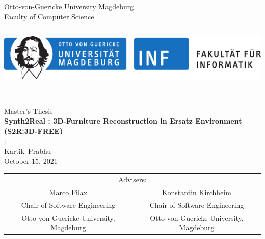 \documentclass[
]{thesis}
\newcommand{\university}{Otto-von-Guericke University Magdeburg}
\newcommand{\school}{Faculty of Computer Science}
\newcommand{\logo}{\includegraphics[trim=0mm 0mm 50mm 0mm,clip,height=3cm]{ovgu}}
\newcommand{\advisorone}{Marco Filax}
\newcommand{\departmentone}{Chair of Software Engineering}
\newcommand{\universityone}{Otto-von-Guericke University, Magdeburg}
\newcommand{\advisortwo}{Konstantin Kirchheim}
\newcommand{\universitytwo}{Otto-von-Guericke University, Magdeburg}
\newcommand{\thesiskind}{Master's Thesis}
\newcommand{\theforename}{Kartik}
\newcommand{\thesurname}{Prabhu}
\newcommand{\thetitle}{Synth2Real : 3D-Furniture Reconstruction in Ersatz Environment \\ (S2R:3D-FREE)}
\newcommand{\thedate}{October 15, 2021}
\begin{document}
\frontmatter
\renewcommand{\proofname}{\itshape\biolinum{Proof}} %
\newcommand{\theauthor}{\theforename\ \thesurname}
\newcommand{\theauthorrev}{\thesurname,\ \theforename}
\graphicspath{{files/}}

\begin{titlepage}
    \thispagestyle{empty}
    \begin{center}
        {\university}\\[0.4cm]
        {\school}\\[2.0cm]
        \hbox{}\hfill
        \begin{minipage}[t]{\textwidth}
            \begin{center}
                \logo
            \end{center}
        \end{minipage}
        \hfill\hbox{}
        \ \\[0.4cm]
        {\large \thesiskind \\[1cm]}
        {\LARGE\bfseries\biolinum \thetitle \\[1cm]}
        {\iftoggle{german}{Autor}{Author}:}\\[0.4cm]
        {\large \theauthor}\\[0.8cm]
        {\large\thedate}\\[0.8cm]

    \vspace{2cm}
    \renewcommand{\arraystretch}{.9}
    \begin{tabular}{cc}
        \multicolumn{2}{c}{\small Advisers:} \\[1mm]
        {\large \advisorone} & {\large \advisortwo} \\[2mm]
        {\small \departmentone} 			 & {\small \departmentone} \\
        {\small \universityone} 			 & {\small \universitytwo} 	\\
    \end{tabular}

    \vspace{1cm}


\end{center}
\end{titlepage}
\end{document}

